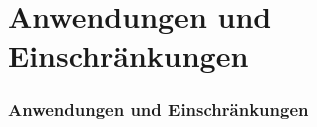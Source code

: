 \section{Anwendungen und Einschränkungen}

\begin{frame}[t]
	\frametitle{Anwendungen und Einschränkungen}

\end{frame}